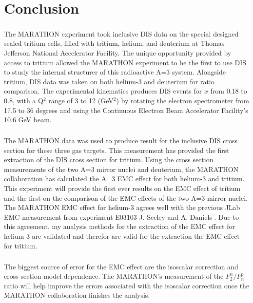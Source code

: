 
\chapter{Conclusion}
\paragraph{}The MARATHON experiment took inclusive DIS data on the special designed sealed tritium cells, filled with tritium, helium, and deuterium at Thomas Jefferson National Accelerator Facility. The unique opportunity provided by access to tritium allowed the MARATHON experiment to be the first to use DIS to study the internal structurer of this radioactive A=3 system. Alongside tritium, DIS data was taken on both helium-3 and deuterium for ratio comparison. The experimental kinematics produces DIS events for $x$ from 0.18 to 0.8, with a Q$^2$ range of 3 to 12 (GeV$^2$) by rotating the electron spectrometer from 17.5 to 36 degrees and using the Continuous Electron Beam Accelerator Facility's 10.6 GeV beam. 
\paragraph{}The MARATHON data was used to produce result for the inclusive DIS cross section for these three gas targets. This measurement has provided the first extraction of the DIS cross section for tritium. Using the cross section measurements of the two A=3 mirror nuclei and deuterium, the MARATHON collaboration has calculated the A=3 EMC effect for both helium-3 and tritium. This experiment will provide the first ever results on the EMC effect of tritium and the first on the comparison of the EMC effects of the two A=3 mirror nuclei. The MARATHON EMC effect for helium-3 agrees well with the previous JLab EMC measurement from experiment E03103 J. Seeley and A. Daniels \cite{seeley}. Due to this agreement, my analysis methods for the extraction of the EMC effect for helium-3 are validated and therefor are valid for the extraction the EMC effect for tritium.
\paragraph{}The biggest source of error for the EMC effect are the isoscalar correction and cross section model dependence. The MARATHON's measurement of the $F^n_2/F^p_n$ ratio will help improve the errors associated with the isoscalar correction once the MARATHON collaboration finishes the analysis. 
